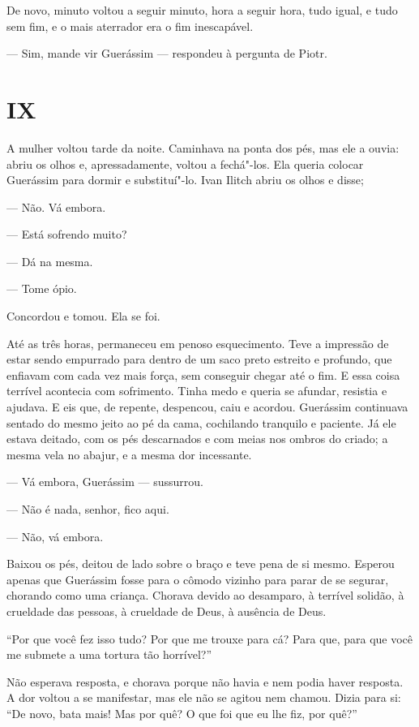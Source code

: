 De novo, minuto voltou a seguir minuto, hora a seguir hora, tudo igual,
e tudo sem fim, e o mais aterrador era o fim inescapável.

--- Sim, mande vir Guerássim --- respondeu à pergunta de Piotr.

\section{IX}

A mulher voltou tarde da noite. Caminhava na ponta dos pés, mas ele a
ouvia: abriu os olhos e, apressadamente, voltou a fechá"-los. Ela queria
colocar Guerássim para dormir e substituí"-lo. Ivan Ilitch abriu os olhos
e disse;

--- Não. Vá embora.

--- Está sofrendo muito?

--- Dá na mesma.

--- Tome ópio.

Concordou e tomou. Ela se foi.

Até as três horas, permaneceu em penoso esquecimento. Teve a impressão
de estar sendo empurrado para dentro de um saco preto estreito e
profundo, que enfiavam com cada vez mais força, sem conseguir chegar até
o fim. E essa coisa terrível acontecia com sofrimento. Tinha medo e
queria se afundar, resistia e ajudava. E eis que, de repente, despencou,
caiu e acordou. Guerássim continuava sentado do mesmo jeito ao pé da
cama, cochilando tranquilo e paciente. Já ele estava deitado, com os pés
descarnados e com meias nos ombros do criado; a mesma vela no abajur, e
a mesma dor incessante.

--- Vá embora, Guerássim --- sussurrou.

--- Não é nada, senhor, fico aqui.

--- Não, vá embora.

Baixou os pés, deitou de lado sobre o braço e teve pena de si mesmo.
Esperou apenas que Guerássim fosse para o cômodo vizinho para parar de
se segurar, chorando como uma criança. Chorava devido ao desamparo, à
terrível solidão, à crueldade das pessoas, à crueldade de Deus, à
ausência de Deus.

``Por que você fez isso tudo? Por que me trouxe para cá? Para que, para
que você me submete a uma tortura tão horrível?''

Não esperava resposta, e chorava porque não havia e nem podia haver
resposta. A dor voltou a se manifestar, mas ele não se agitou nem
chamou. Dizia para si: ``De novo, bata mais! Mas por quê? O que foi que
eu lhe fiz, por quê?''

